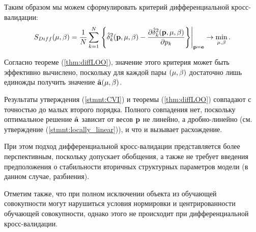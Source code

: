 Таким образом мы можем сформулировать критерий дифференциальной кросс-валидации:
\begin{equation}
	\label{diffLOO}
	S_{Diff}({\mu,\beta}) 
	= \frac1N\sum\limits_{k=1}^N \left. \left\{
		\hat{\delta}_k^2(\boldsymbol{\mathbf{p}}, {\mu,\beta})
		- \frac{\partial\hat{\delta}_k^2(\boldsymbol{\mathbf{p}}, {\mu,\beta})}{\partial p_k} 
	\right\}\right|_{\boldsymbol{\mathbf{p}}=\boldsymbol{\mathbf{e}}} \to \mathop{\mbox{min}}\limits_{{\mu,\beta}}.
\end{equation}

Согласно теореме (\ref{thm:diffLOO}), значение этого критерия может быть эффективно вычислено, поскольку для каждой пары $({\mu,\beta})$ достаточно лишь единожды получить значение $\hat{\boldsymbol{\mathbf{a}}}({\mu,\beta})$.

Результаты утверждения (\ref{stmnt:CVI}) и теоремы (\ref{thm:diffLOO}) совпадают с точностью до малых второго порядка. 
Полного совпадения нет, поскольку оптимальное решение $\hat{\boldsymbol{\mathbf{a}}}$ зависит от весов $\boldsymbol{\mathbf{p}}$ не линейно, 
а дробно-линейно (см. утверждение (\ref{stmnt:locally_linear})), и что и вызывает расхождение.

При этом подход дифференциальной кросс-валидации представляется более перспективным, поскольку допускает обобщения, 
а также не требует введения предположения о стабильности вторичных структурных параметров модели (в данном случае, разбиения).

Отметим также, что при полном исключении объекта из обучающей совокупности могут нарушиться условия нормировки и центрированности обучающей совокупности, однако этого не происходит при дифференциальной кросс-валидации.
